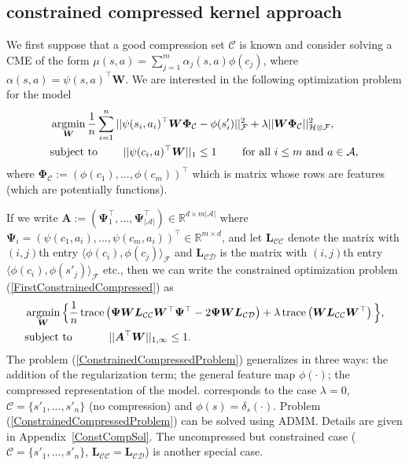 \documentclass[letterpaper]{article}
\newcommand{\CsabaFLAM}{DBLP:conf/adprl/YaoSPZ14}
\newcommand{\cD}{{\mathcal D}}
\newcommand{\cC}{{\mathcal C}}
\newcommand{\cH}{{\mathcal H}}
\newcommand{\cF}{{\mathcal F}}
\newcommand{\cA}{{\mathcal A}}
\newcommand{\bL}{{\bm L}}
\newcommand{\bW}{{\bm W}}
\newcommand{\bA}{{\bm A}}
\newcommand{\bPsi}{{\bm \Psi}}
\newcommand{\bPhi}{{\bm \Phi}}
\newcommand{\R}{{\mathbb R}}
\newcommand{\argmin}{\operatornamewithlimits{argmin}}
\newcommand{\trace}{\operatornamewithlimits{trace}}
\newcommand{\lang}{\langle}
\newcommand{\rang}{\rangle}
\newcommand{\nn}{\nonumber}
\begin{document}
\subsection{constrained compressed kernel approach}

We first suppose that a good compression set $\cC$ is known and consider solving a CME of the form $\mu(s,a) = \sum_{j=1}^m \alpha_j(s,a) \phi(c_j)$, where $\alpha(s,a) = \psi(s,a)^\top \bW$. We are interested in the following optimization problem for the model
\begin{align}
&\argmin_{\bW} \frac{1}{n} \sum_{i=1}^n|| \psi(s_i,a_i)^\top \bW \bPhi_{\cC}  - \phi(s_i') ||^2_{\cF} + \lambda||\bW \bPhi_{\cC}||^2_{\cH\otimes\cF}, \nn\\
&\mbox{subject to }\quad\quad ||\psi(c_i,a)^\top \bW||_1\le 1  \quad \quad \mbox{ for all } i\le m \mbox{ and } a\in\cA, \label{FirstConstrainedCompressed}
\end{align}
where $\bPhi_{\cC} := (\phi(c_1) , ... , \phi(c_m))^\top$ which is matrix whose rows  are features (which are potentially functions).

If we write $\bA:= (\bPsi_1^\top ,...,\bPsi_{|\cA|}^\top  )\in\R^{d\times m|\cA|}$ where $\bPsi_i = (\psi(c_1,a_i) , ... , \psi(c_m,a_i))^\top \in\R^{m\times d}$, and let $\bL_{\cC\cC}$ denote the matrix with $(i,j)$th entry $\lang \phi(c_i) , \phi(c_j)\rang_{\cF}$ and $\bL_{\cC\cD}$ is the matrix with $(i,j)$th entry $\lang \phi(c_i) , \phi(s'_j)\rang_{\cF}$ etc., then we can write the constrained optimization problem (\ref{FirstConstrainedCompressed}) as
\begin{align}
&\argmin_{\bW} \Big\{ \frac{1}{n} \trace\left( \bPsi \bW \bL_{\cC\cC} \bW^\top \bPsi^\top - 2\bPsi\bW\bL_{\cC\cD} \right) + \lambda   \trace\left(\bW \bL_{\cC\cC} \bW^\top\right) \Big\} , \nn\\
&\mbox{subject to } \quad\quad\quad ||\bA^\top \bW ||_{1,\infty}\le 1. \label{ConstrainedCompressedProblem}
\end{align}
The problem (\ref{ConstrainedCompressedProblem}) generalizes \cite{\CsabaFLAM} in three ways: the addition of the regularization term; the general feature map $\phi(\cdot)$; the compressed representation of the model. \cite{\CsabaFLAM} corresponds to the case $\lambda = 0$, $\cC = \{s'_1,...,s'_n\}$ (no compression) and $\phi(s) = \delta_s(\cdot)$. Problem (\ref{ConstrainedCompressedProblem}) can be solved using ADMM. Details are given in Appendix~\ref{ConstCompSol}. The uncompressed but constrained case ($\cC = \{s'_1,...,s'_n\}$, $\bL_{\cC\cC} = \bL_{\cC\cD}$) is another special case.


\fi
\end{document}
